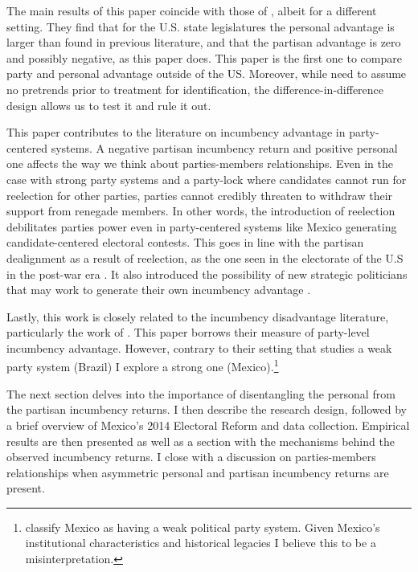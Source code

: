 \documentclass[12pt]{amsart}
\numberwithin{equation}{section}
\theoremstyle{definition}
\theoremstyle{definition}
\theoremstyle{definition}
\begin{document}
The main results of this paper coincide with those of \citep{fowler_hall_2014}, albeit for a different setting. They find that for the U.S. state legislatures the personal advantage is larger than found in previous literature, and that the partisan advantage is zero and possibly negative, as this paper does. This paper is the first one to compare party and personal advantage outside of the US. Moreover, while \citet{fowler_hall_2014} need to assume no pretrends prior to treatment for identification, the difference-in-difference design allows us to test it and rule it out. 

This paper contributes to the literature on incumbency advantage in party-centered systems. A negative partisan incumbency return and positive personal one affects the way we think about parties-members relationships. Even in the case with strong party systems and a party-lock where candidates cannot run for reelection for other parties, parties cannot credibly threaten to withdraw their support from renegade members. In other words, the introduction of reelection debilitates parties power even in party-centered systems like Mexico generating candidate-centered electoral contests. This goes in line with the partisan dealignment as a result of reelection, as the one seen in the electorate of the U.S in the post-war era  \citep{cox_katz_1996}. It also introduced the possibility of new strategic politicians that may work to generate their own incumbency advantage  \citep{mayhew_1974, mckelvey_riezman_1992}.  
 

Lastly, this work is closely related to the incumbency disadvantage literature, particularly the work of \citet{klasnja_titiunik_2017}. This paper borrows their measure of party-level incumbency advantage. However, contrary to their setting that studies a weak party system (Brazil) I explore a strong one (Mexico).\footnote{\citet{klasnja_titiunik_2017} classify Mexico as having a weak political party system. Given Mexico's institutional characteristics and historical legacies I believe this to be a misinterpretation.}

The next section delves into the importance of disentangling the personal from the partisan incumbency returns. I then describe the research design, followed by a brief overview of Mexico's 2014 Electoral Reform and data collection. Empirical results are then presented as well as a section with the mechanisms behind the observed incumbency returns. I close with a discussion on parties-members relationships when asymmetric personal and partisan incumbency returns are present. 
\end{document}
